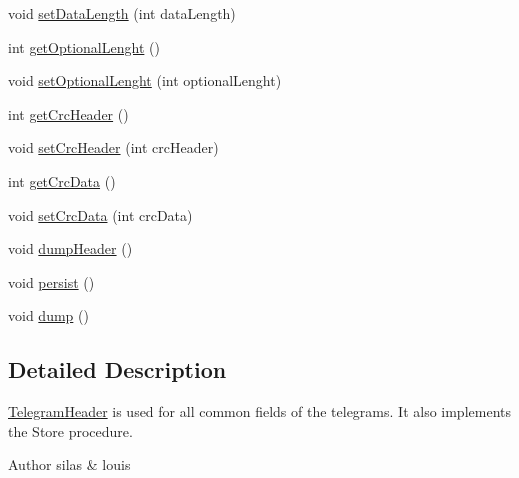 \begin{DoxyCompactItemize}
\item 
void \hyperlink{classch_1_1bfh_1_1gr33nopo55um_1_1enocean_1_1telegram_1_1_telegram_header_a84897f02d09c4e945d65ac4e1ceb89b9}{set\+Data\+Length} (int data\+Length)
\item 
int \hyperlink{classch_1_1bfh_1_1gr33nopo55um_1_1enocean_1_1telegram_1_1_telegram_header_a6aa37ad4cb093b505a528c1f228397a7}{get\+Optional\+Lenght} ()
\item 
void \hyperlink{classch_1_1bfh_1_1gr33nopo55um_1_1enocean_1_1telegram_1_1_telegram_header_acdf067918f2831e911c329886dda9313}{set\+Optional\+Lenght} (int optional\+Lenght)
\item 
int \hyperlink{classch_1_1bfh_1_1gr33nopo55um_1_1enocean_1_1telegram_1_1_telegram_header_a19f7324b9134ed9036dd0acdbe56ac71}{get\+Crc\+Header} ()
\item 
void \hyperlink{classch_1_1bfh_1_1gr33nopo55um_1_1enocean_1_1telegram_1_1_telegram_header_a482eb2b68615cfdc688228ae1f1faf6d}{set\+Crc\+Header} (int crc\+Header)
\item 
int \hyperlink{classch_1_1bfh_1_1gr33nopo55um_1_1enocean_1_1telegram_1_1_telegram_header_a5df9e708d1076ada3e4ad5584400f01c}{get\+Crc\+Data} ()
\item 
void \hyperlink{classch_1_1bfh_1_1gr33nopo55um_1_1enocean_1_1telegram_1_1_telegram_header_ab69b9adbda2c4911d8d7ab02e3e275e9}{set\+Crc\+Data} (int crc\+Data)
\item 
void \hyperlink{classch_1_1bfh_1_1gr33nopo55um_1_1enocean_1_1telegram_1_1_telegram_header_ac208ecfcda97ef433f2fedc0e806080a}{dump\+Header} ()
\item 
void \hyperlink{classch_1_1bfh_1_1gr33nopo55um_1_1enocean_1_1telegram_1_1_telegram_header_aa66a49f7ecb9ee5ea4e768f7ca7e2ac2}{persist} ()
\item 
void \hyperlink{classch_1_1bfh_1_1gr33nopo55um_1_1enocean_1_1telegram_1_1_telegram_header_a48bf46a6054ed9625e0e47d112eb4bee}{dump} ()
\end{DoxyCompactItemize}


\subsection{Detailed Description}
\hyperlink{classch_1_1bfh_1_1gr33nopo55um_1_1enocean_1_1telegram_1_1_telegram_header}{Telegram\+Header} is used for all common fields of the telegrams. It also implements the Store procedure.

\begin{DoxyAuthor}{Author}
silas \& louis 
\end{DoxyAuthor}


